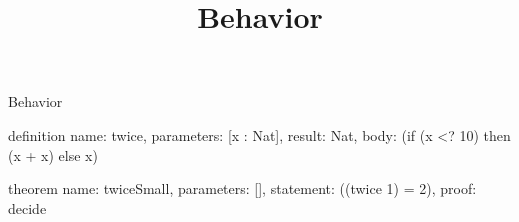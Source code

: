 \begin{lexlean}{Behavior}
\title{Behavior}
\begin{semanticmodule}
definition{
  name: twice,
  parameters: [x : Nat],
  result: Nat,
  body: (if (x <? 10) then (x + x) else x)
}

theorem{
  name: twiceSmall,
  parameters: [],
  statement: ((twice 1) = 2),
  proof: decide{}
}
\end{semanticmodule}
\end{lexlean}
